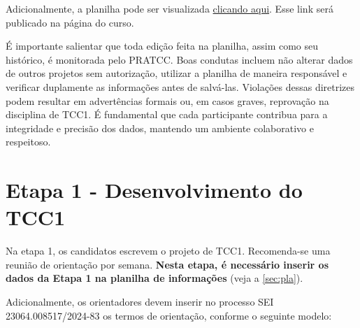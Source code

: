 \documentclass[a4paper, 12pt]{article}
\newcommand{\seiprocess}{23064.008517/2024-83} %
\begin{document}
	Adicionalmente, a planilha pode ser visualizada \href{https://docs.google.com/spreadsheets/d/e/2PACX-1vQKQ_bI1Ka_BKbx_LZkVxxYrV69ROWFWqE8V_niYUJP7EjumnNhUP65tGiUxh32qgDYW_WWdC5nJelJ/pubhtml}{clicando aqui}. Esse link será publicado na página do curso.

	É importante salientar que toda edição feita na planilha, assim como seu histórico, é monitorada pelo PRATCC. Boas condutas incluem não alterar dados de outros projetos sem autorização, utilizar a planilha de maneira responsável e verificar duplamente as informações antes de salvá-las. Violações dessas diretrizes podem resultar em advertências formais ou, em casos graves, reprovação na disciplina de TCC1. É fundamental que cada participante contribua para a integridade e precisão dos dados, mantendo um ambiente colaborativo e respeitoso.

	\section{Etapa 1 - Desenvolvimento do TCC1}
	\label{sec:et1}
	Na etapa 1, os candidatos escrevem o projeto de TCC1. Recomenda-se uma reunião de orientação por semana. \textbf{Nesta etapa, é necessário inserir os dados da Etapa 1 na planilha de informações} (veja a \autoref{sec:pla}).
	
	Adicionalmente, os orientadores devem inserir no processo SEI \seiprocess{} os termos de orientação, conforme o seguinte modelo:
\end{document}
